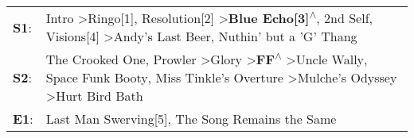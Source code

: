 \begin{supertabular}{p{0.03\textwidth}p{0.92\textwidth}}
 \textbf{S1}:  &                                                                    Intro\textsuperscript{} \textgreater \enspace Ringo[1]\textsuperscript{}, \enspace Resolution[2]\textsuperscript{} \textgreater \enspace \textbf{Blue Echo[3]\textsuperscript{$\wedge$}}, \enspace 2nd Self\textsuperscript{}, \enspace Visions[4]\textsuperscript{} \textgreater \enspace Andy's Last Beer\textsuperscript{}, \enspace Nuthin' but a 'G' Thang\textsuperscript{}  \enspace  \\
 \textbf{S2}:  &  The Crooked One\textsuperscript{}, \enspace Prowler\textsuperscript{} \textgreater \enspace Glory\textsuperscript{} \textgreater \enspace \textbf{FF\textsuperscript{$\wedge$}} \textgreater \enspace Uncle Wally\textsuperscript{}, \enspace Space Funk Booty\textsuperscript{}, \enspace Miss Tinkle's Overture\textsuperscript{} \textgreater \enspace Mulche's Odyssey\textsuperscript{} \textgreater \enspace Hurt Bird Bath\textsuperscript{}  \enspace  \\
 \textbf{E1}:  &                                                                                                                                                                                                                                                                                                                                                         Last Man Swerving[5]\textsuperscript{}, \enspace The Song Remains the Same\textsuperscript{}  \enspace  \\
\end{supertabular}
